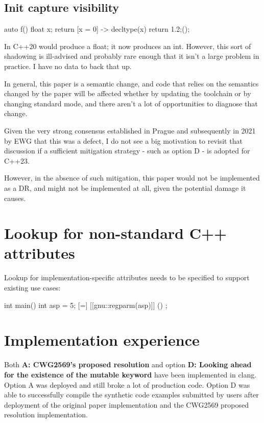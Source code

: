 \documentclass{wg21}
\begin{document}
\subsection{Init capture visibility}
\begin{colorblock}
auto f() {
    float x;
    return [x = 0] -> decltype(x){ return 1.2;}();
}
\end{colorblock}

In C++20  would produce a float; it now produces an int.
However, this sort of shadowing is ill-advised and probably rare enough that it isn't a large problem in practice.
I have no data to back that up.


In general, this paper is a semantic change, and code that relies on the semantics changed by the paper will be affected
whether by updating the toolchain or by changing standard mode, and there aren't a lot of opportunities to diagnose that change.

Given the very strong consensus established in Prague and subsequently in 2021 by EWG that this was a defect, I do not see a big motivation to revisit
that discussion if a sufficient mitigation strategy - such as option D - is adopted for C++23.

However, in the absence of such mitigation, this paper would not be implemented as a DR, and might not be implemented at all, given the potential damage it causes.

\section{Lookup for non-standard C++ attributes}

Lookup for implementation-specific attributes needs to be specified to support existing use cases:

\begin{colorblock}
int main() {
    int asp = 5;
    [=] [[gnu::regparm(asp)]] () {};
}
\end{colorblock}


\section{Implementation experience}

Both \textbf{A: CWG2569's proposed resolution} and option \textbf{D: Looking ahead for the existence of the mutable keyword} have been implemented in clang.
Option A was deployed and still broke a lot of production code.
Option D was able to successfully compile the synthetic code examples submitted by users after deployment of the original paper implementation and the CWG2569 proposed resolution implementation.
\end{document}
